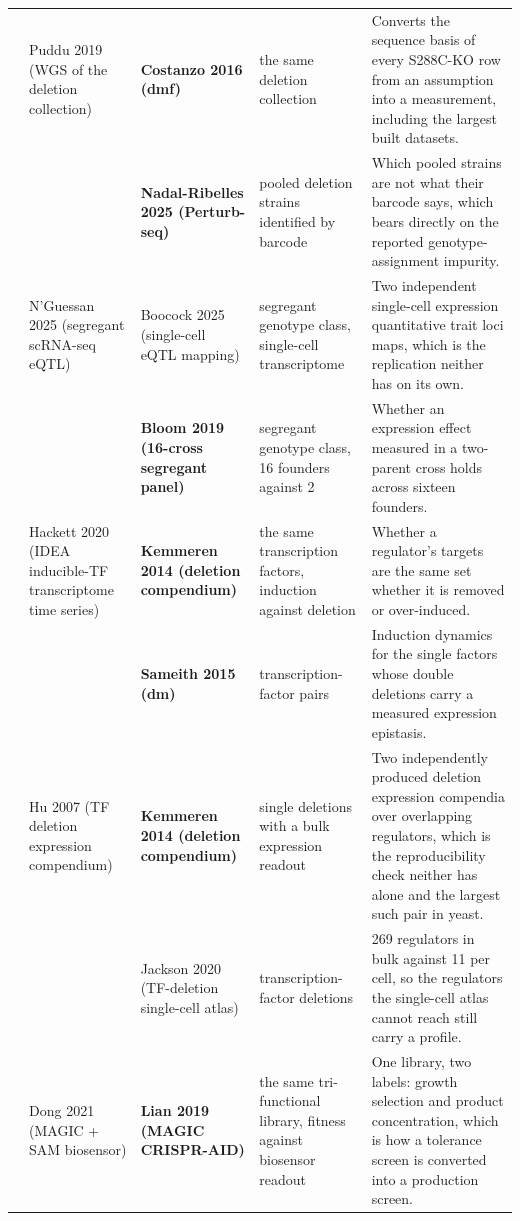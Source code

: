 \begin{landscape}
\begin{longtable}{@{}r@{\hspace{4pt}} L{42mm} L{44mm} L{48mm} L{96mm}@{}}
 & Puddu 2019 (WGS of the deletion collection) & \textbf{Costanzo 2016 (dmf)} & the same deletion collection & Converts the sequence basis of every S288C-KO row from an assumption into a measurement, including the largest built datasets. \\
 &  & \textbf{Nadal-Ribelles 2025 (Perturb-seq)} & pooled deletion strains identified by barcode & Which pooled strains are not what their barcode says, which bears directly on the reported genotype-assignment impurity. \\
 & N'Guessan 2025 (segregant scRNA-seq eQTL) & Boocock 2025 (single-cell eQTL mapping) & segregant genotype class, single-cell transcriptome & Two independent single-cell expression quantitative trait loci maps, which is the replication neither has on its own. \\
 &  & \textbf{Bloom 2019 (16-cross segregant panel)} & segregant genotype class, 16 founders against 2 & Whether an expression effect measured in a two-parent cross holds across sixteen founders. \\
 & Hackett 2020 (IDEA inducible-TF transcriptome time series) & \textbf{Kemmeren 2014 (deletion compendium)} & the same transcription factors, induction against deletion & Whether a regulator's targets are the same set whether it is removed or over-induced. \\
 &  & \textbf{Sameith 2015 (dm)} & transcription-factor pairs & Induction dynamics for the single factors whose double deletions carry a measured expression epistasis. \\
 & Hu 2007 (TF deletion expression compendium) & \textbf{Kemmeren 2014 (deletion compendium)} & single deletions with a bulk expression readout & Two independently produced deletion expression compendia over overlapping regulators, which is the reproducibility check neither has alone and the largest such pair in yeast. \\
 &  & Jackson 2020 (TF-deletion single-cell atlas) & transcription-factor deletions & 269 regulators in bulk against 11 per cell, so the regulators the single-cell atlas cannot reach still carry a profile. \\
 & Dong 2021 (MAGIC + SAM biosensor) & \textbf{Lian 2019 (MAGIC CRISPR-AID)} & the same tri-functional library, fitness against biosensor readout & One library, two labels: growth selection and product concentration, which is how a tolerance screen is converted into a production screen. \\

\end{longtable}
\end{landscape}
